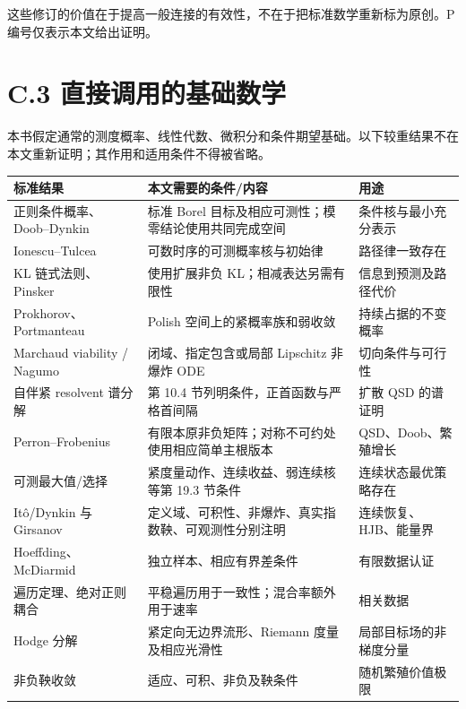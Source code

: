 \documentclass[
  11pt,
  oneside]{book}
\newcounter{none} %
\begin{document}
这些修订的价值在于提高一般连接的有效性，不在于把标准数学重新标为原创。P 编号仅表示本文给出证明。

\section{C.3 直接调用的基础数学}\label{c.3-ux76f4ux63a5ux8c03ux7528ux7684ux57faux7840ux6570ux5b66}

本书假定通常的测度概率、线性代数、微积分和条件期望基础。以下较重结果不在本文重新证明；其作用和适用条件不得被省略。

{\def\LTcaptype{none} %
\begin{longtable}[]{@{}
  >{\raggedright\arraybackslash}p{}
  >{\raggedright\arraybackslash}p{}
  >{\raggedright\arraybackslash}p{}@{}}
\toprule\noalign{}
\begin{minipage}[b]{\linewidth}\raggedright
标准结果
\end{minipage} & \begin{minipage}[b]{\linewidth}\raggedright
本文需要的条件/内容
\end{minipage} & \begin{minipage}[b]{\linewidth}\raggedright
用途
\end{minipage} \\
\midrule\noalign{}
\endhead
\bottomrule\noalign{}
\endlastfoot
正则条件概率、Doob--Dynkin & 标准 Borel 目标及相应可测性；模零结论使用共同完成空间 & 条件核与最小充分表示 \\
Ionescu--Tulcea & 可数时序的可测概率核与初始律 & 路径律一致存在 \\
KL 链式法则、Pinsker & 使用扩展非负 KL；相减表达另需有限性 & 信息到预测及路径代价 \\
Prokhorov、Portmanteau & Polish 空间上的紧概率族和弱收敛 & 持续占据的不变概率 \\
Marchaud viability / Nagumo & 闭域、指定包含或局部 Lipschitz 非爆炸 ODE & 切向条件与可行性 \\
自伴紧 resolvent 谱分解 & 第 10.4 节列明条件，正首函数与严格首间隔 & 扩散 QSD 的谱证明 \\
Perron--Frobenius & 有限本原非负矩阵；对称不可约处使用相应简单主根版本 & QSD、Doob、繁殖增长 \\
可测最大值/选择 & 紧度量动作、连续收益、弱连续核等第 19.3 节条件 & 连续状态最优策略存在 \\
Itô/Dynkin 与 Girsanov & 定义域、可积性、非爆炸、真实指数鞅、可观测性分别注明 & 连续恢复、HJB、能量界 \\
Hoeffding、McDiarmid & 独立样本、相应有界差条件 & 有限数据认证 \\
遍历定理、绝对正则耦合 & 平稳遍历用于一致性；混合率额外用于速率 & 相关数据 \\
Hodge 分解 & 紧定向无边界流形、Riemann 度量及相应光滑性 & 局部目标场的非梯度分量 \\
非负鞅收敛 & 适应、可积、非负及鞅条件 & 随机繁殖价值极限 \\
\end{longtable}
}
\end{document}
